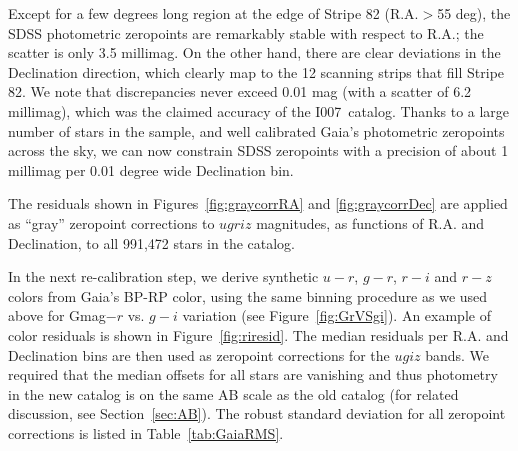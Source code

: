 \documentclass[fleqn,usenatbib]{mnras}
\newcommand{\pOc}{\hbox{I007 catalog}}
\begin{document}
Except for a few degrees long region at the edge of Stripe 82 (R.A.$>$55 deg), the
SDSS photometric zeropoints are remarkably stable with respect to R.A.; the scatter
is only 3.5 millimag. On the other hand, there are clear deviations in the Declination 
direction, which clearly map to the 12 scanning strips that fill Stripe 82. We note
that discrepancies never exceed 0.01 mag (with a scatter of 6.2 millimag), which was 
the claimed accuracy of the \pOc. Thanks to a large number of stars in the sample,
and well calibrated Gaia's photometric zeropoints across the sky, we can now 
constrain SDSS zeropoints with a precision of about 1 millimag per 0.01 degree
wide Declination bin. 

The residuals shown in Figures~\ref{fig:graycorrRA} and \ref{fig:graycorrDec} are
applied as ``gray'' zeropoint corrections to $ugriz$ magnitudes, as functions of 
R.A. and Declination, to all 991,472 stars in the catalog. %

In the next re-calibration step, we derive synthetic $u-r$, $g-r$, $r-i$ and $r-z$ colors
from Gaia's BP-RP color, using the same binning procedure as we used above for 
Gmag$-r$ vs. $g-i$ variation (see Figure~\ref{fig:GrVSgi}). An example of color residuals 
is shown in Figure~\ref{fig:riresid}.  The median residuals per R.A. and Declination bins 
are then used as zeropoint corrections for the $ugiz$ bands. We required that the median
offsets for all stars are vanishing and thus photometry in the new catalog is on the 
same AB scale as the old catalog (for related discussion, see Section~\ref{sec:AB}). 
The robust standard deviation for all zeropoint corrections is listed in Table~\ref{tab:GaiaRMS}. 

\end{document}
